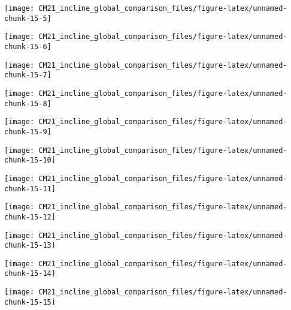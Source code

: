 \documentclass[
  10pt,
  a4paper,oneside]{article}
\begin{document}
\begin{center}\texttt{[image: CM21\_incline\_global\_comparison\_files/figure-latex/unnamed-chunk-15-5]} \end{center}

\begin{center}\texttt{[image: CM21\_incline\_global\_comparison\_files/figure-latex/unnamed-chunk-15-6]} \end{center}

\begin{center}\texttt{[image: CM21\_incline\_global\_comparison\_files/figure-latex/unnamed-chunk-15-7]} \end{center}

\begin{center}\texttt{[image: CM21\_incline\_global\_comparison\_files/figure-latex/unnamed-chunk-15-8]} \end{center}

\begin{center}\texttt{[image: CM21\_incline\_global\_comparison\_files/figure-latex/unnamed-chunk-15-9]} \end{center}

\begin{center}\texttt{[image: CM21\_incline\_global\_comparison\_files/figure-latex/unnamed-chunk-15-10]} \end{center}

\begin{center}\texttt{[image: CM21\_incline\_global\_comparison\_files/figure-latex/unnamed-chunk-15-11]} \end{center}

\begin{center}\texttt{[image: CM21\_incline\_global\_comparison\_files/figure-latex/unnamed-chunk-15-12]} \end{center}

\begin{center}\texttt{[image: CM21\_incline\_global\_comparison\_files/figure-latex/unnamed-chunk-15-13]} \end{center}

\begin{center}\texttt{[image: CM21\_incline\_global\_comparison\_files/figure-latex/unnamed-chunk-15-14]} \end{center}

\begin{center}\texttt{[image: CM21\_incline\_global\_comparison\_files/figure-latex/unnamed-chunk-15-15]} \end{center}
\end{document}
